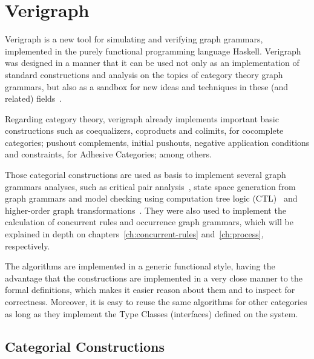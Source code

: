 \chapter{Verigraph}\label{ch:verigraph}

Verigraph is a new tool for simulating and verifying graph grammars, implemented in the purely functional programming language Haskell. Verigraph was designed in a manner that it can be used not only as an implementation of standard constructions and analysis on the topics of category theory graph grammars, but also as a sandbox for new ideas and techniques in these (and related) fields~\cite{BezerraETMF2016,Costa2016,CostaETMF2016, Becker2014}.

Regarding category theory, verigraph already implements important basic constructions such as coequalizers, coproducts and colimits, for cocomplete categories; pushout complements, initial pushouts, negative application conditions and constraints, for Adhesive Categories; among others.

Those categorial constructions are used as basis to implement several graph grammars analyses, such as critical pair analysis~\cite{Lambers2006}, state space generation from graph grammars and model checking using computation tree logic (CTL)~\cite{Becker2014} and higher-order graph transformations~\cite{Machado2015}. They were also used to implement the calculation of concurrent rules and occurrence graph grammars, which will be explained in depth on chapters~\ref{ch:concurrent-rules}
and~\ref{ch:process}, respectively.

The algorithms are implemented in a generic functional style, having the advantage that the constructions are implemented in a very close manner to the formal definitions, which makes it easier reason about them and to inspect for correctness. Moreover, it is easy to reuse the same algorithms for other categories as long as they implement the Type Classes (interfaces) defined on the system.

\section{Categorial Constructions}

